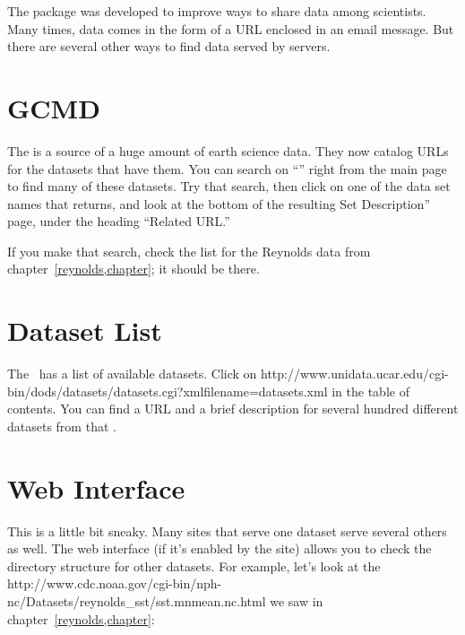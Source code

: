 \documentclass{dods-book}
\begin{document}
The \opendap package was developed to improve ways to share data among
scientists.  Many times, data comes in the form of a URL enclosed in
an email message.  But there are several other ways to find data served
by \opendap servers.

\section{GCMD}

  The  is a source of a huge
amount of earth science data.  They now catalog \opendap URLs for the
datasets that have them.  You can search on ``\opendap'' right from the
main page to find many of these datasets.  Try that search, then click
on one of the data set names that returns, and look at the bottom of
the resulting Set Description'' page, under the heading ``Related
URL.''

If you make that search, check the list for the Reynolds data from
chapter~\ref{reynolds,chapter}; it should be there.

\section{\opendap Dataset List}

The \OPDhome\ has a list of available \opendap datasets.  Click on
{http://www.unidata.ucar.edu/cgi-bin/dods/datasets/datasets.cgi?xmlfilename=datasets.xml}
in the table of contents.  You can find a URL and a
brief description for several hundred different datasets from that
.

\section{Web Interface}

This is a little bit sneaky.  Many sites that serve one \opendap dataset
serve several others as well.  The \opendap web interface (if it's enabled
by the site) allows you to check the directory structure for other
datasets.  For example, let's look at the 
{http://www.cdc.noaa.gov/cgi-bin/nph-nc/Datasets/reynolds_sst/sst.mnmean.nc.html}
we saw in chapter~\ref{reynolds,chapter}:
\end{document}
